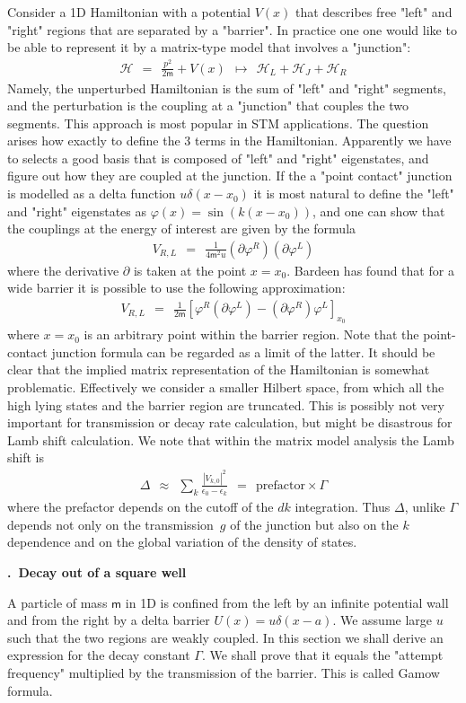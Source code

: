 \documentclass[onecolumn,fleqn, 11pt]{revtex4}
\newcommand{\mass}{\mathsf{m}}
\newcommand{\beq}{\begin{eqnarray}}
\newcommand{\eeq}{\end{eqnarray}}
\renewcommand{\thesubsection}{\arabic{subsection}}
\renewcommand{\thesubsubsection}{\arabic{subsubsection}}
\newcommand{\sheadC}[1]
{
\addtocounter{subsubsection}{1}
\vspace{5mm}
{\bf \thesubsection.\thesubsubsection \ #1}  
\nopagebreak
\phantomsection
}
\begin{document}
Consider a 1D Hamiltonian with a potential $V(x)$ that 
describes free "left" and "right" regions that are 
separated by a "barrier". 
In practice one one would like to be able to represent 
it by a matrix-type model that involves a "junction":
\beq
\mathcal{H} \ \ = \ \ \frac{p^2}{2\mass} + V(x) \ \ \mapsto \ \ \mathcal{H}_L + \mathcal{H}_J +  \mathcal{H}_R
\eeq
Namely, the unperturbed Hamiltonian is the sum of "left" and "right" segments, 
and the perturbation is the coupling at a "junction" that couples the 
two segments. This approach is most popular in STM applications. 
The question arises how exactly to define the 3 terms in the Hamiltonian. 
Apparently we have to selects a good basis that is composed of "left" and "right" eigenstates, 
and figure out how they are coupled at the junction. 
If the a "point contact" junction is modelled as a delta function ${u\delta(x-x_0)}$
it is most natural to define the  "left" and "right" eigenstates 
as ${\varphi(x) = \sin(k(x-x_0))}$, and one can show that the couplings 
at the energy of interest are given by the formula
\beq
V_{R,L} \ \ = \ \ \frac{1}{4\mass^2 u} (\partial \varphi^R)(\partial \varphi^L)
\eeq
where the derivative $\partial$ is taken at the point ${x=x_0}$. 
Bardeen has found that for a wide barrier it is possible to 
use the following approximation:
\beq
V_{R,L} \ \ = \ \ \frac{1}{2\mass} \left[ \varphi^R (\partial \varphi^L) - (\partial \varphi^R) \varphi^L \right]_{x_0} 
\eeq
where ${x=x_0}$ is an arbitrary point within the barrier region. 
Note that the point-contact junction formula can be regarded 
as a limit of the latter. 
It should be clear that the implied matrix representation of the Hamiltonian 
is somewhat problematic. Effectively we consider a smaller Hilbert space, 
from which all the high lying states and the barrier region are truncated.
This is possibly not very important for transmission or decay rate calculation, 
but might be disastrous for Lamb shift calculation. 
We note that within the matrix model analysis the Lamb shift is     
\beq
\Delta \ \ \approx \ \ \sum_k \frac{|V_{k,0}|^2}{\epsilon_0-\epsilon_k} \ \ =  \ \ \text{prefactor} \times \Gamma
\eeq
where the prefactor depends on the cutoff of the $dk$ integration. 
Thus $\Delta$, unlike $\Gamma$ depends not only on the transmission~$g$ 
of the junction but also on the $k$ dependence and on the global variation 
of the density of states.  
 

\newpage
\sheadC{Decay out of a square well}


A particle of mass $\mass$ in 1D is confined from the left 
by an infinite potential wall and from the right 
by a delta barrier $U(x)=u\delta(x-a)$. 
We assume large $u$ such that the two regions 
are weakly coupled. In this section we shall 
derive an expression for the decay constant $\Gamma$. 
We shall prove that it equals the "attempt frequency" 
multiplied by the transmission of the barrier. 
This is called Gamow formula.   
\end{document}
